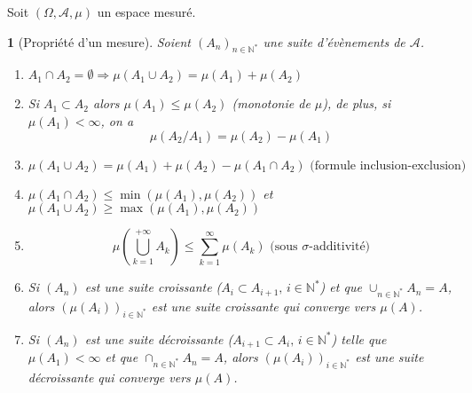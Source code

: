 \documentclass[8pt,notheorems]{beamer}
\def \Om{\Omega}
\def \N{\mathbb N}
\newtheorem{prop}{\translate{Proposition}}
\theoremstyle{definition}
\theoremstyle{example}
\theoremstyle{mystyle}
\theoremstyle{plain}
\begin{document}
\begin{frame}[allowframebreaks]
Soit $(\Om, \mathcal{A}, \mu)$ un espace mesuré.
\begin{prop}[Propriété d'un mesure]
Soient $(A_n)_{n\in\mathbb{N}^\ast}$ une suite d'évènements de $\mathcal{A}$.
\begin{enumerate}
\item $A_1\cap A_2 = \emptyset \Longrightarrow \mu(A_1\cup A_2)=\mu(A_1) + \mu(A_2)$
\item Si $A_1\subset A_2$ alors $\mu(A_1)\leq \mu(A_2)$ (monotonie de $\mu$), de plus, si $\mu(A_1) < \infty$, on a
$$
\mu(A_2/A_1)=\mu(A_2)-\mu(A_1)
$$
\item$
\mu(A_1\cup A_2)=\mu(A_1)+\mu(A_2)-\mu(A_1\cap A_2) \text{ (formule inclusion-exclusion)}
$
\item $\mu(A_1\cap A_2)\leq \min(\mu(A_1),\mu(A_2)) $ et $\mu(A_1\cup A_2)\geq  \max(\mu(A_1),\mu(A_2)) $
\item
 $$\mu\left(\bigcup_{k=1}^{+\infty}A_k\right)\leq \sum_{k=1}^{\infty}\mu\left(A_k\right)\text{ (sous $\sigma$-additivité)}$$
\item Si $(A_n)$ est une suite croissante ($A_i\subset A_{i+1}\text{, }i\in \mathbb{N}^\ast$) et que $\cup_{n\in\N^\ast}A_n = A$, alors $\left(\mu(A_i)\right)_{i\in\N^\ast}$ est une suite croissante qui converge vers $\mu(A)$.
\item Si $(A_n)$ est une suite décroissante ($A_{i+1}\subset A_{i}\text{, }i\in \mathbb{N}^\ast$) telle que $\mu(A_1)<\infty$ et que $\cap_{n\in\N^\ast}A_n = A$, alors $\left(\mu(A_i)\right)_{i\in\N^\ast}$ est une suite décroissante qui converge vers $\mu(A)$.
\end{enumerate}
\end{prop}
\end{frame}
\end{document}
